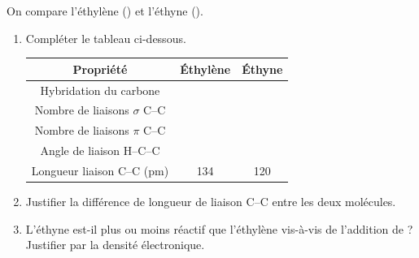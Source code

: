 \documentclass[11pt]{article}
\begin{document}
\begin{exercice}
On compare l'éthylène () et l'éthyne ().
\begin{enumerate}
    \item Compléter le tableau ci-dessous.
    \begin{tabular}{|c|c|c|}
    \hline
    Propriété & Éthylène & Éthyne \\
    \hline
    Hybridation du carbone & & \\
    \hline
    Nombre de liaisons $\sigma$ C--C & & \\
    \hline
    Nombre de liaisons $\pi$ C--C & & \\
    \hline
    Angle de liaison H--C--C & & \\
    \hline
    Longueur liaison C--C (pm) & \SI{134}{} & \SI{120}{} \\
    \hline
    \end{tabular}
    \item Justifier la différence de longueur de liaison C--C entre les deux molécules.
    \item L'éthyne est-il plus ou moins réactif que l'éthylène vis-à-vis de l'addition de  ? Justifier par la densité électronique.
\end{enumerate}
\end{exercice}
\end{document}
